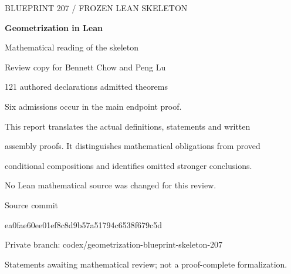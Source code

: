 \hypersetup{pageanchor=false}
\begin{titlepage}
\thispagestyle{empty}
\vspace*{0.45in}
{\sffamily\small\color{reviewgray}BLUEPRINT 207 / FROZEN LEAN SKELETON}\par
\vspace{0.7in}
{\Huge\bfseries\color{reviewnavy}Geometrization in Lean}\par
\vspace{0.25in}
{\LARGE Mathematical reading of the skeleton}\par
\vspace{0.45in}
{\Large Review copy for Bennett Chow and Peng Lu}\par
\vspace{0.7in}
{\large 121 authored declarations\quad\textbar{} admitted theorems}\par
\vspace{0.14in}
{\large Six admissions occur in the main endpoint proof.}\par
\vspace{0.6in}
This report translates the actual definitions, statements and written\par
assembly proofs. It distinguishes mathematical obligations from proved\par
conditional compositions and identifies omitted stronger conclusions.\par
\vspace{0.35in}
No Lean mathematical source was changed for this review.\par
\vfill
{\small Source commit}\par
{\footnotesize\ttfamily ea0fae60ee01ef8c8d9b57a51794c6538f679c5d}\par
\vspace{0.12in}
{\small Private branch: codex/geometrization-blueprint-skeleton-207}\par
\vspace{0.35in}
{\small Statements awaiting mathematical review; not a proof-complete formalization.}
\end{titlepage}
\setcounter{page}{1}
\hypersetup{pageanchor=true}

